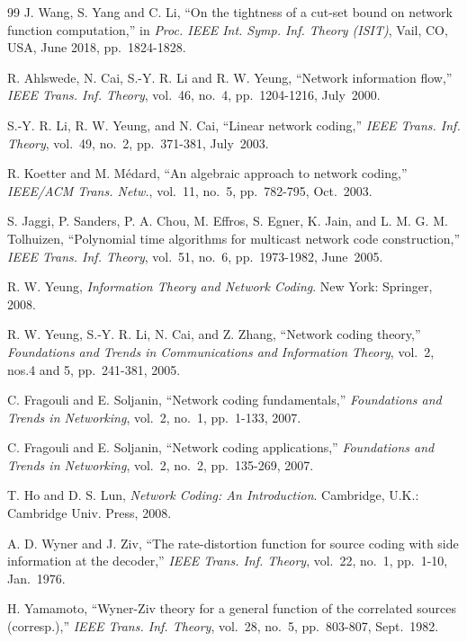 \documentclass[11pt,draftclsnofoot,onecolumn]{IEEEtran}
\begin{document}
\begin{thebibliography}{99}
J. Wang, S. Yang and C. Li, ``On the tightness of a cut-set bound on network function computation,''
in \textit{Proc. IEEE Int. Symp. Inf. Theory (ISIT)}, Vail, CO, USA, June 2018, pp.~1824-1828.






R. Ahlswede, N. Cai, S.-Y. R. Li and R. W. Yeung, ``Network information flow,''
\textit{IEEE Trans. Inf. Theory}, vol.~46, no.~4, pp.~1204-1216, July~2000.


S.-Y. R. Li, R. W. Yeung, and N. Cai, ``Linear network coding,''
\textit{IEEE Trans. Inf. Theory}, vol.~49, no.~2, pp.~371-381, July~2003.

R. Koetter and M. M\'{e}dard, ``An algebraic approach
to network coding,''
 \textit{IEEE/ACM Trans. Netw.}, vol.~11, no.~5,
pp.~782-795, Oct.~2003.

S. Jaggi, P. Sanders, P. A. Chou, M. Effros, S. Egner, K. Jain, and
L. M. G. M. Tolhuizen, ``Polynomial time algorithms for multicast
network code construction,''
\textit{IEEE Trans. Inf. Theory}, vol.~51, no.~6, pp.~1973-1982, June~2005.


R. W. Yeung,
\textit{Information Theory and Network Coding}. New York: Springer, 2008.

R. W. Yeung, S.-Y. R. Li, N. Cai, and Z. Zhang, ``Network coding theory,''
\textit{Foundations and Trends in Communications and Information Theory}, vol.~2, nos.4 and 5,
pp.~241-381, 2005.

C. Fragouli and E. Soljanin, ``Network coding fundamentals,''
\textit{Foundations and Trends in Networking}, vol.~2, no.~1, pp.~1-133, 2007.

C. Fragouli and E. Soljanin, ``Network coding applications,''
\textit{Foundations and Trends in Networking}, vol.~2, no.~2, pp.~135-269, 2007.

T. Ho and D. S. Lun, \textit{Network Coding: An Introduction}. Cambridge, U.K.: Cambridge Univ. Press, 2008.


 A. D. Wyner and J. Ziv, ``The rate-distortion function for source coding
with side information at the decoder,''
\textit{IEEE Trans. Inf. Theory}, vol.~22,
no.~1, pp.~1-10, Jan.~1976.

 H. Yamamoto, ``Wyner-Ziv theory for a general function of the
correlated sources (corresp.),''
 \textit{IEEE Trans. Inf. Theory}, vol.~28, no.~5,
pp.~803-807, Sept.~1982.


\end{thebibliography}
\end{document}
